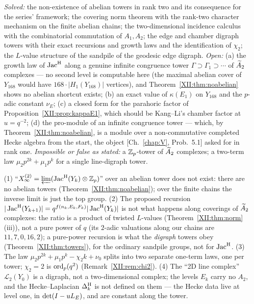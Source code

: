 \begin{remark}\label{XII:rem:scope}
\emph{Solved:} the non-existence of abelian towers in rank two and its consequence for the
series' framework; the covering norm theorem with the rank-two character mechanism on the
finite abelian chains; the two-dimensional incidence calculus with the combinatorial
commutation of $A_1,A_2$; the edge and chamber digraph towers with their exact recursions
and growth laws and the identification of $\chi_2$; the $L$-value structure of the sandpile
of the geodesic edge digraph. \emph{Open:} (a) the growth law of $\operatorname{Jac}^{\mathrm{H}}$ along a genuine
infinite congruence tower $\Gamma\supset\Gamma_1\supset\cdots$ of $\widetilde A_2$ complexes --- no
second level is computable here (the maximal abelian cover of $Y_{168}$ would have
$168\cdot|H_1(Y_{168})|$ vertices), and Theorem~\ref{XII:thm:noabelian} shows no abelian
shortcut exists; (b) an exact value of $\kappa(E_1)$ on $Y_{168}$ and the $p$-adic constant
$\nu_E$; (c) a closed form for the parahoric factor of Proposition~\ref{XII:prop:kappaE1}, which
should be Kang--Li's chamber factor at $u=q^{-2}$; (d) the pro-module of an infinite
congruence tower --- which, by Theorem~\ref{XII:thm:noabelian}, is a module over a
non-commutative completed Hecke algebra from the start, the object [Ch.~\ref{chap:V}, Prob.~5.1] asked for
in rank one. \emph{Impossible or false as stated:} a $\mathbb{Z}_p$-tower of $\widetilde A_2$ complexes; a
two-term law $\mu_2p^{2k}+\mu_1p^{k}$ for a single line-digraph tower.
\end{remark}

\begin{remark}\label{XII:rem:corrections}
(1) ``$X_\infty^{(2)}=\varprojlim(\operatorname{Jac}^{\mathrm{H}}(Y_k)\otimes\mathbb{Z}_p)$'' over an abelian tower does not
exist: there are no abelian towers (Theorem~\ref{XII:thm:noabelian}); over the finite chains the
inverse limit is just the top group. (2) The proposed recursion $|\operatorname{Jac}^{\mathrm{H}}(Y_{k+1})|=
q^{f(n_k,E_k,F_k)}|\operatorname{Jac}^{\mathrm{H}}(Y_k)|$ is not what happens along coverings of $\widetilde A_2$ complexes: the
ratio is a product of twisted $L$-values (Theorem~\ref{XII:thm:norm}(iii)), not a pure power of
$q$ (its $2$-adic valuations along our chains are $11,7,0,16,2$); a pure-power recursion is
what the \emph{digraph} towers obey (Theorem~\ref{XII:thm:towers}), for the ordinary sandpile
groups, not for $\operatorname{Jac}^{\mathrm{H}}$. (3) The law $\mu_2p^{2k}+\mu_1p^{k}-\chi_2k+\nu_0$ splits into two
separate one-term laws, one per tower; $\chi_2=2$ is $\operatorname{ord}_p(q^{2})$
(Remark~\ref{XII:rem:chi2}). (4) The ``2D line complex'' $\mathcal L_2(Y_0)$ is a digraph, not a
two-dimensional complex; the levels $E_k$ carry no $A_2$, and the Hecke--Laplacian
$\Delta^{\mathrm{H}}_k$ is not defined on them --- the Hecke data live at level one, in
$\det(I-uL_E)$, and are constant along the tower.
\end{remark}

